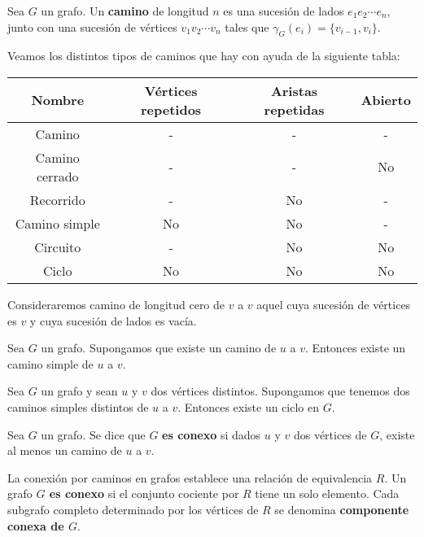\begin{ndef}
    Sea $G$ un grafo. Un \textbf{camino} de longitud $n$ es una sucesión de lados $e_1 e_2 \cdots e_n$, junto con una sucesión de vértices $v_1 v_2 \cdots v_n$ tales que $\gamma_G(e_i) = \{v_{i-1},v_i\}$.
\end{ndef}

Veamos los distintos tipos de caminos que hay con ayuda de la siguiente tabla:
\begin{center}
    \begin{tabular}{|c|c|c|c|}
        \hline
        Nombre         & Vértices repetidos & Aristas repetidas & Abierto \\
        \hline
        Camino         & -                  & -                 & -       \\
        Camino cerrado & -                  & -                 & No      \\
        Recorrido      & -                  & No                & -       \\
        Camino simple  & No                 & No                & -       \\
        Circuito       & -                  & No                & No      \\
        Ciclo          & No                 & No                & No      \\
        \hline
    \end{tabular}
\end{center}
Consideraremos camino de longitud cero de $v$ a $v$ aquel cuya sucesión de vértices es $v$ y cuya sucesión de lados es vacía.

\begin{nprop}
    Sea $G$ un grafo. Supongamos que existe un camino de $u$ a $v$. Entonces existe un camino simple de $u$ a $v$.
\end{nprop}

\begin{nprop}
    Sea $G$ un grafo y sean $u$ y $v$ dos vértices distintos. Supongamos que tenemos dos caminos simples distintos de $u$ a $v$. Entonces existe un ciclo en $G$.
\end{nprop}

\begin{ndef}[Conexión]
    Sea $G$ un grafo. Se dice que $G$ \textbf{es conexo} si dados $u$ y $v$ dos vértices de $G$, existe al menos un camino de $u$ a $v$.
\end{ndef}
\begin{nota}
    La conexión por caminos en grafos establece una relación de equivalencia $R$. Un grafo \textbf{$G$ es conexo} si el conjunto cociente por $R$ tiene un solo elemento. Cada subgrafo completo determinado por los vértices de $R$ se denomina \textbf{componente conexa de $G$}.
\end{nota}

